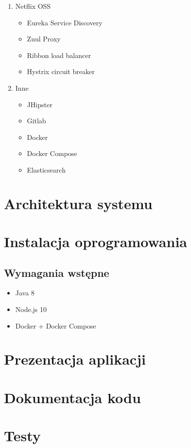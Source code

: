 \begin{enumerate}
    \item Netflix OSS \cite{tech:netflix-oss}
    \begin{itemize}
        \item Eureka Service Discovery \cite{tech:netflix-eureka}
        \item Zuul Proxy \cite{tech:netflix-zuul}
        \item Ribbon load balancer \cite{tech:netflix-ribbon}
        \item Hystrix circuit breaker \cite{tech:netflix-hystrix}
    \end{itemize}
    \item Inne
    \begin{itemize}
        \item JHipster \cite{tech:jhipster}
        \item Gitlab \cite{tech:gitlab}
        \item Docker \cite{tech:docker}
        \item Docker Compose \cite{tech:docker-compose}
        \item Elasticsearch \cite{tech:elasticsearch}
    \end{itemize}
\end{enumerate}
\section{Architektura systemu}\label{sec:system-architecture}
\section{Instalacja oprogramowania}\label{sec:software-installation}
\subsection{Wymagania wstępne}\label{subsec:prerequirements}
\begin{itemize}
    \item Java 8 \cite{tech:java}
    \item Node.js 10 \cite{tech:nodejs}
    \item Docker \cite{tech:docker} + Docker Compose \cite{tech:docker-compose}
\end{itemize}
\section{Prezentacja aplikacji}\label{sec:app-presentation}
\section{Dokumentacja kodu}\label{sec:code-documentation}
\section{Testy}\label{sec:tests}
\thispagestyle{normal}

